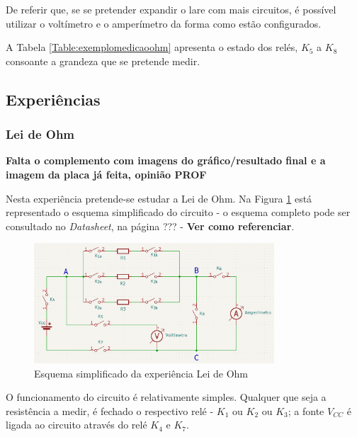 De referir que, se se pretender expandir o \acrshort{lare} com mais circuitos, é possível utilizar o voltímetro e o amperímetro da forma como estão configurados. 

A Tabela \ref{Table:exemplomedicaoohm} apresenta o estado dos relés, $K_{5}$ a $K_{8}$ consoante a grandeza que se pretende medir.

\subsection{Experiências}
\subsubsection{Lei de Ohm}
\label{sec:lei_ohm}
\textbf{Falta o complemento com imagens do gráfico/resultado final e a imagem da placa já feita, opinião PROF}

Nesta experiência pretende-se estudar a Lei de Ohm. Na Figura \ref{fig:esq_geral_ohm} está representado o esquema simplificado do circuito - o esquema completo pode ser consultado no \textit{Datasheet}, na página ??? - \textbf{Ver como referenciar}.

\begin{figure}[hbtp]
	\centering
	\includegraphics[width=0.8\textwidth]{figures/esquema_simplificado_OHM.png}
	\caption{Esquema simplificado da experiência Lei de Ohm}
	\label{fig:esq_geral_ohm}
\end{figure}

O funcionamento do circuito é relativamente simples. Qualquer que seja a resistência a medir, é fechado o respectivo relé - $K_{1}$ ou $K_{2}$ ou $K_{3}$; a fonte $V_{CC}$ é ligada ao circuito através do relé $K_{4}$ e $K_{7}$.

